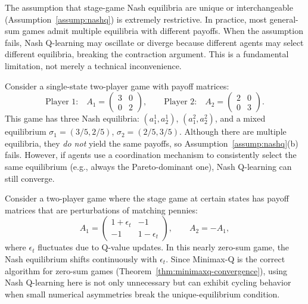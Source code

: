 \documentclass[11pt,a4paper]{article}
\begin{document}
\begin{warning}
The assumption that stage-game Nash equilibria are unique or
interchangeable (Assumption~\ref{assump:nashq}) is extremely restrictive.
In practice, most general-sum games admit multiple equilibria with
different payoffs.  When the assumption fails, Nash Q-learning may
oscillate or diverge because different agents may select different
equilibria, breaking the contraction argument.  This is a fundamental
limitation, not merely a technical inconvenience.
\end{warning}

\begin{example}
\label{ex:nashq-converge}
Consider a single-state two-player game with payoff matrices:
\[
  \text{Player 1:} \quad
  A_1 = \begin{pmatrix} 3 & 0 \\ 0 & 2 \end{pmatrix},
  \qquad
  \text{Player 2:} \quad
  A_2 = \begin{pmatrix} 2 & 0 \\ 0 & 3 \end{pmatrix}.
\]
This game has three Nash equilibria: $(a_1^1, a_2^1)$, $(a_1^2, a_2^2)$,
and a mixed equilibrium $\sigma_1 = (3/5, 2/5)$,
$\sigma_2 = (2/5, 3/5)$.  Although there are multiple equilibria, they
\emph{do not} yield the same payoffs, so
Assumption~\ref{assump:nashq}(b) fails.  However, if agents use a
coordination mechanism to consistently select the same equilibrium (e.g.,
always the Pareto-dominant one), Nash Q-learning can still converge.
\end{example}

\begin{example}
\label{ex:nashq-fail}
Consider a two-player game where the stage game at certain states
has payoff matrices that are perturbations of matching pennies:
\[
  A_1 = \begin{pmatrix} 1+\epsilon_t & -1 \\ -1 & 1-\epsilon_t \end{pmatrix},
  \qquad
  A_2 = -A_1,
\]
where $\epsilon_t$ fluctuates due to Q-value updates.  In this nearly
zero-sum game, the Nash equilibrium shifts continuously with
$\epsilon_t$.  Since Minimax-Q is the correct algorithm for zero-sum
games (Theorem~\ref{thm:minimaxq-convergence}), using Nash Q-learning
here is not only unnecessary but can exhibit cycling behavior when
small numerical asymmetries break the unique-equilibrium condition.
\end{example}
\end{document}

